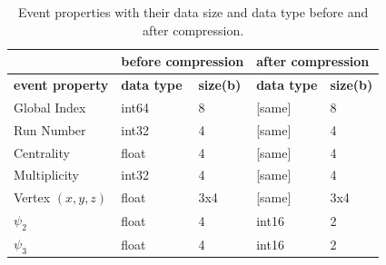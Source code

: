 \documentclass[
  a4paper,
  12pt,
  oneside,
  parskip=half,
  listof=totoc,
  bibliography=totoc,
  DIV=12,
  numbers=noenddot,
  BA.tex
  ]{subfiles}
\begin{document}
\begin{table}[H]
	\begin{footnotesize}
		\begin{center}
			\begin{tabular}{lllll}
				\hline
				& \multicolumn{2}{l}{\textbf{before compression}} & \multicolumn{2}{l}{\textbf{after compression}} \\ \hline
				\textbf{event property} & \multicolumn{1}{l}{\textbf{data type}}  & \textbf{size(b)}  & \multicolumn{1}{l}{\textbf{data type}}  & \textbf{size(b)} \\ \hline
				Global Index  		& \multicolumn{1}{l}{int64}           &   8    	& \multicolumn{1}{l}{[same]}           &   8   \\ 
				Run Number      	& \multicolumn{1}{l}{int32}           &   4	   	& \multicolumn{1}{l}{[same]}           &    4  \\ 
				Centrality      	& \multicolumn{1}{l}{float}           &   4    	& \multicolumn{1}{l}{[same]}           &    4  \\ 
				Multiplicity    	& \multicolumn{1}{l}{int32}           &   4    	& \multicolumn{1}{l}{[same]}           &  4    \\ 
				Vertex $(x,y,z)$	& \multicolumn{1}{l}{float}           &   3x4  	& \multicolumn{1}{l}{[same]}           &    3x4  \\ 
				$\psi_2$        	& \multicolumn{1}{l}{float}           &   4	   	& \multicolumn{1}{l}{int16}           &    2  \\ 
				$\psi_3$        	& \multicolumn{1}{l}{float}           &   4   	& \multicolumn{1}{l}{int16}           &    2  \\ \hline
			\end{tabular}
		\end{center}
	\end{footnotesize}
	\caption{Event properties with their data size and data type before and after compression.}
	\label{table:event_properties}
\end{table}
\end{document}
